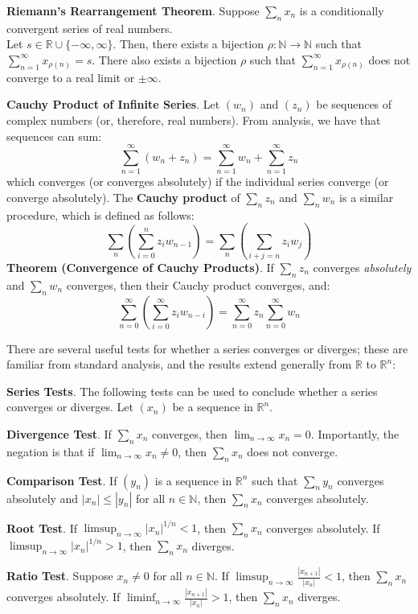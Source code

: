 \textbf{Riemann's Rearrangement Theorem}. Suppose $\sum_n x_n$ is a conditionally convergent series of real numbers.\\ Let $s\in \mathbb{R}\cup\{-\infty, \infty\}$. Then, there exists a bijection $\rho:\mathbb{N}\to\mathbb{N}$ such that $\displaystyle\sum_{n=1}^\infty x_{\rho(n)} = s$. There also exists a bijection $\rho$ such that $\displaystyle\sum_{n=1}^\infty x_{\rho(n)}$ does not converge to a real limit or $\pm\infty$.

\newpage
\begin{shaded}
    \textbf{Cauchy Product of Infinite Series}. Let $(w_n)$ and $(z_n)$ be sequences of complex numbers (or, therefore, real numbers). From analysis, we have that sequences can sum: \[\sum_{n=1}^\infty (w_n + z_n) = \sum_{n=1}^\infty w_n + \sum_{n=1}^\infty z_n\] which converges (or converges absolutely) if the individual series converge (or converge absolutely). The \textbf{Cauchy product} of $\sum_n z_n$ and $\sum_n w_n$ is a similar procedure, which is defined as follows: \[\sum_n \left(\sum_{i=0}^nz_iw_{n-1}\right) = \sum_n \left(\sum_{i+j=n} z_i w_j\right)\] \textbf{Theorem (Convergence of Cauchy Products)}. If $\sum_n z_n$ converges \textit{absolutely} and $\sum_n w_n$ converges, then their Cauchy product converges, and: \[\sum_{n=0}^\infty \left(\sum_{i=0}^\infty z_i w_{n-i}\right) = \sum_{n=0}^\infty z_n \sum_{n=0}^\infty w_n\]
\end{shaded}

There are several useful tests for whether a series converges or diverges; these are familiar from standard analysis, and the results extend generally from $\mathbb{R}$ to $\mathbb{R}^n$:

\begin{shaded}
    \textbf{Series Tests}. The following tests can be used to conclude whether a series converges or diverges. Let $(x_n)$ be a sequence in $\mathbb{R}^n$.
    
    \textbf{Divergence Test}. If $\sum_n x_n$ converges, then $\displaystyle\lim_{n\to\infty} x_n = 0$. Importantly, the negation is that if $\displaystyle\lim_{n\to\infty} x_n\neq 0$, then $\sum_n x_n$ does not converge.

    \textbf{Comparison Test}. If $(y_n)$ is a sequence in $\mathbb{R}^n$ such that $\sum_n y_n$ converges absolutely and $|x_n|\leq |y_n|$ for all $n\in\mathbb{N}$, then $\sum_n x_n$ converges absolutely.

    \textbf{Root Test}. If $\displaystyle\limsup_{n\to\infty} |x_n|^{1/n} < 1$, then $\sum_n x_n$ converges absolutely. If $\displaystyle\limsup_{n\to\infty} |x_n|^{1/n} > 1$, then $\sum_n x_n$ diverges.

    \textbf{Ratio Test}. Suppose $x_n\neq 0$ for all $n\in\mathbb{N}$. If $\displaystyle\limsup_{n\to\infty} \frac{|x_{n+1}|}{|x_n|}< 1$, then $\sum_n x_n$ converges absolutely. If $\displaystyle\liminf_{n\to\infty} \frac{|x_{n+1}|}{|x_n|}> 1$, then $\sum_n x_n$ diverges.
\end{shaded}

